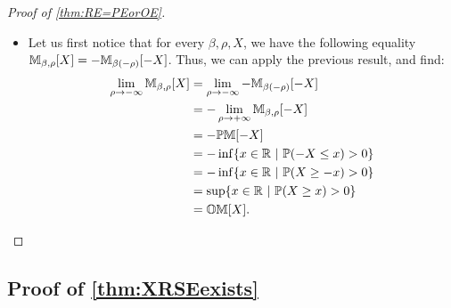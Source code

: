 \begin{proof}[Proof of \cref{thm:RE=PEorOE}]
\begin{itemize}
        \item Let us first notice that for every $\beta, \rho, X$, we have the following equality $\mathbb{M}_{\beta,\rho}[X] = -\mathbb{M}_{\beta(-\rho)}[-X]$.
        Thus, we can apply the previous result, and find:
        \begin{align*}
        \lim_{\rho \to -\infty} \mathbb{M}_{\beta,\rho} [X] 
        &= \lim_{\rho \to -\infty} -\mathbb{M}_{\beta(-\rho)} [-X]
        \\&= -\lim_{\rho \to +\infty} \mathbb{M}_{\beta,\rho} [-X]
        \\& =  - \mathbb{PM}[-X]
        \\ &= - \inf \{x \in \mathbb{R} ~|~ \mathbb{P}(-X \leq x) > 0\}
        \\ &= - \inf \{x \in \mathbb{R} ~|~ \mathbb{P}(X \geq -x) > 0\}
        \\ &= \sup \{x \in \mathbb{R} ~|~ \mathbb{P}(X \geq x) > 0\}
        \\ &= \mathbb{OM}[X].
        \end{align*}
        \end{itemize}
\end{proof}





\subsection{Proof of \cref{thm:XRSEexists}}\label{app:XRSEexists}

